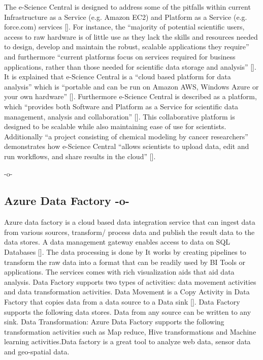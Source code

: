The e-Science Central is designed to address some of the pitfalls
within current Infrastructure as a Service (e.g.  Amazon EC2) and
Platform as a Service (e.g. force.com)
services [\cite{e-science-central-paper-2010}]. For instance, the
``majority of potential scientific users, access to raw hardware is of
little use as they lack the skills and resources needed to design,
develop and maintain the robust, scalable applications they require''
and furthermore ``current platforms focus on services required for
business applications, rather than those needed for scientific data
storage and analysis'' [\cite{e-science-central-paper-2010}]. It is
explained that e-Science Central is a ``cloud based platform for data
analysis'' which is ``portable and can be run on Amazon AWS, Windows
Azure or your own hardware'' [\cite{www-e-science-central}].
Furthermore e-Science Central is described as a platform, which
``provides both Software and Platform as a Service for scientific data
management, analysis and collaboration''
 [\cite{e-science-central-paper-2010}]. This collaborative platform is
designed to be scalable while also maintaining ease of use for
scientists.  Additionally ``a project consisting of chemical modeling
by cancer researchers'' demonstrates how e-Science Central ``allows
scientists to upload data, edit and run workflows, and share results
in the cloud'' [\cite{e-science-central-paper-2010}].

    -o-

\subsection{Azure Data Factory -o-}
    
Azure data factory is a cloud based data integration service that can
ingest data from various sources, transform/ process data and publish
the result data to the data stores. A data management gateway enables
access to data on SQL Databases [\cite{www-jamesserra}]. The data
processing is done by It works by creating pipelines to transform the
raw data into a format that can be readily used by BI Tools or
applications. The services comes with rich visualization aids that aid
data analysis. Data Factory supports two types of activities: data
movement activities and data transformation activities. Data Movement
is a Copy Activity in Data Factory that copies data from a data source
to a Data sink [\cite{www-microsoft-azure}]. Data Factory supports the
following data stores. Data from any source can be written to any
sink.  Data Transformation: Azure Data Factory supports the following
transformation activities such as Map reduce, Hive transformations and
Machine learning activities.Data factory is a great tool to analyze
web data, sensor data and geo-spatial data.

